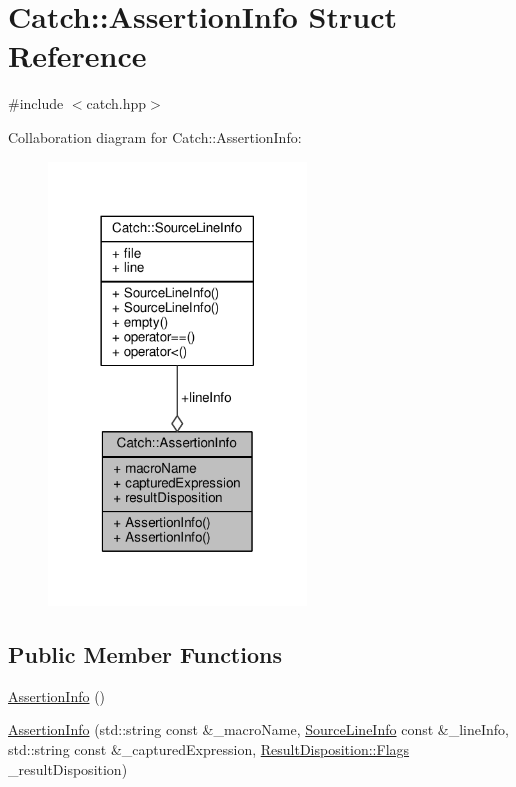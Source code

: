 \hypertarget{struct_catch_1_1_assertion_info}{\section{Catch\-:\-:Assertion\-Info Struct Reference}
\label{struct_catch_1_1_assertion_info}
}


{\ttfamily \#include $<$catch.\-hpp$>$}



Collaboration diagram for Catch\-:\-:Assertion\-Info\-:
\nopagebreak
\begin{figure}[H]
\begin{center}
\leavevmode
\includegraphics[width=194pt]{struct_catch_1_1_assertion_info__coll__graph}
\end{center}
\end{figure}
\subsection*{Public Member Functions}
\begin{DoxyCompactItemize}
\item 
\hyperlink{struct_catch_1_1_assertion_info_a15c29d306c86361f842a0351a6003b9f}{Assertion\-Info} ()
\item 
\hyperlink{struct_catch_1_1_assertion_info_aaf6cc3eebd40391e54d37ed42953c73f}{Assertion\-Info} (std\-::string const \&\-\_\-macro\-Name, \hyperlink{struct_catch_1_1_source_line_info}{Source\-Line\-Info} const \&\-\_\-line\-Info, std\-::string const \&\-\_\-captured\-Expression, \hyperlink{struct_catch_1_1_result_disposition_a3396cad6e2259af326b3aae93e23e9d8}{Result\-Disposition\-::\-Flags} \-\_\-result\-Disposition)
\end{DoxyCompactItemize}
